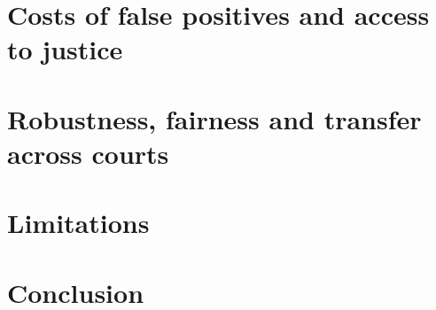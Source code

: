 \documentclass[11pt,a4paper]{article}
\begin{document}
\section{Costs of false positives and access to justice}

\section{Robustness, fairness and transfer across courts}

\section{Limitations}

\section{Conclusion}






\end{document}
